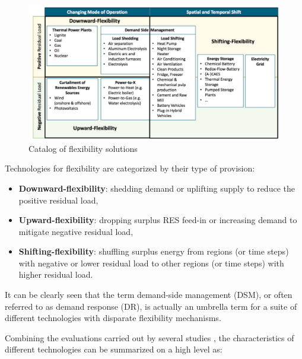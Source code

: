 \begin{figure}[h!]
	\centering
	\includegraphics[width=0.95\linewidth]{Figures/TechnologyOptions}
	\caption{Catalog of flexibility solutions \cite{Muller2016}}
	\label{fig:TechnologyOptions}
\end{figure}

Technologies for flexibility are categorized by their type of provision:

\begin{itemize}
	\item \textbf{Downward-flexibility}: shedding demand or uplifting supply to reduce the positive residual load,
	\item \textbf{Upward-flexibility}: dropping surplus RES feed-in or increasing demand to mitigate negative residual load,
	\item  \textbf{Shifting-flexibility}: shuffling surplus energy from regions (or time steps) with negative or lower residual load to other regions (or time steps) with higher residual load.
\end{itemize}

It can be clearly seen that the term demand-side management (DSM), or often referred to as demand response (DR), is actually an umbrella term for a suite of different technologies with disparate flexibility mechanisms. 

Combining the evaluations carried out by several studies \cite{Cochran2014,Wang2017,Lund2015,Muller2016,Despres2017}, the characteristics of different technologies can be summarized on a high level as:


